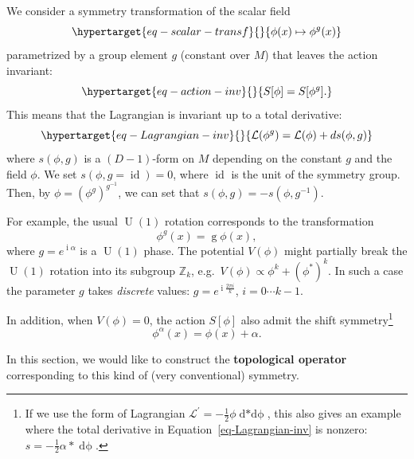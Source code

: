 \documentclass[
  letterpaper,
  DIV=11,
  numbers=noendperiod]{scrreport}
\DeclareMathOperator{\U}{U}
\DeclareMathOperator{\imunit}{i}
\DeclareMathOperator{\id}{id}
\newcommand{\stdim}{D}
\begin{document}
We consider a symmetry transformation of the scalar field
\begin{equation}\protect\hypertarget{eq-scalar-transf}{}{
\phi(x) \mapsto \phi^g(x)
}\label{eq-scalar-transf}\end{equation} parametrized by a group element
\(g\) (constant over \(M\)) that leaves the action invariant:
\begin{equation}\protect\hypertarget{eq-action-inv}{}{
S[\phi]=S[\phi^g].
}\label{eq-action-inv}\end{equation} This means that the Lagrangian is
invariant up to a total derivative:
\begin{equation}\protect\hypertarget{eq-Lagrangian-inv}{}{
\mathcal{L}(\phi^g) = \mathcal{L}(\phi) + \mathop{ds}(\phi,g) 
}\label{eq-Lagrangian-inv}\end{equation} where \(s(\phi,g)\) is a
\((\stdim-1)\)-form on \(M\) depending on the constant \(g\) and the
field \(\phi\). We set \(s(\phi,g=\id) = 0\), where \(\id\) is the unit
of the symmetry group. Then, by \(\phi = (\phi^g)^{g^{-1}}\), we can set
that \(s(\phi,g) = - s(\phi,g^{-1})\).

For example, the usual \(\U(1)\) rotation corresponds to the
transformation \[
\phi^g(x) = \mathop{g} \phi(x),
\] where \(g=e^{\imunit \alpha}\) is a \(\U(1)\) phase. The potential
\(V(\phi)\) might partially break the \(\U(1)\) rotation into its
subgroup \(\mathbb{Z}_k\), e.g.~\(V(\phi)\propto \phi^k+(\phi^*)^k\). In
such a case the parameter \(g\) takes \emph{discrete} values:
\(g = e^{\imunit \frac{2\pi i}{k}}\), \(i= 0 \cdots k-1\).

In addition, when \(V(\phi)=0\), the action \(S[\phi]\) also admit the
shift symmetry\footnote{If we use the form of Lagrangian
  \(\mathcal{L}^\prime= -\frac12 \phi \mathop{d*d\phi}\), this also
  gives an example where the total derivative in
  Equation~\ref{eq-Lagrangian-inv} is nonzero:
  \(s=-\frac12 \alpha \mathop{*}\mathop{d\phi}\).} \[
\phi^{\alpha}(x) = \phi(x) + \alpha.
\]

In this section, we would like to construct the \textbf{topological
operator} corresponding to this kind of (very conventional) symmetry.
\end{document}
